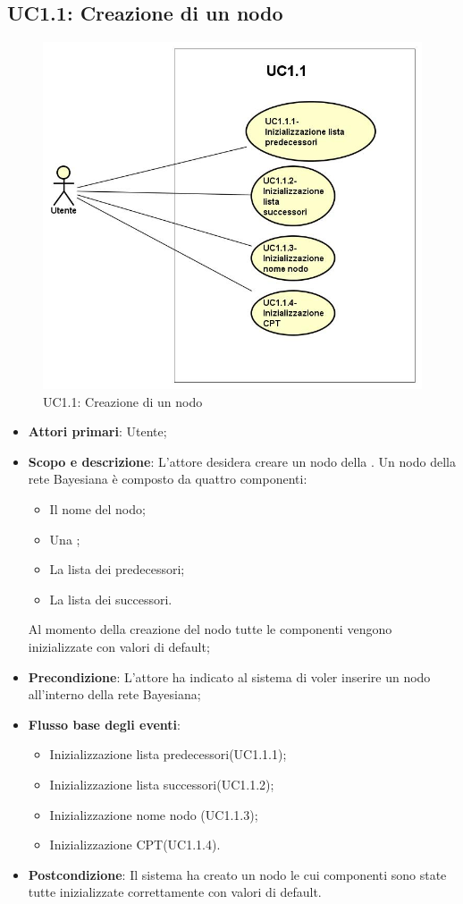 \subsection{UC1.1: Creazione di un nodo}
\hypertarget{UC1.1}{}  
\begin{figure} [H]
	\centering
	\includegraphics[scale=0.45]{Img/UC1-1} 
	\caption{UC1.1: Creazione di un nodo} \label{} 
\end{figure} 
\begin{itemize} 
	\item{\textbf{Attori primari}: Utente;} 
	\item{\textbf{Scopo e descrizione}: L'attore desidera creare un nodo della . Un nodo della rete Bayesiana è composto da quattro componenti: 
		\begin{itemize} 
			\item{Il nome del nodo;} 
			\item{Una ;} 
			\item{La lista dei predecessori;} 
			\item{La lista dei successori.} 
		\end{itemize} 
		Al momento della creazione del nodo tutte le componenti vengono inizializzate con valori di default;} 
	\item{\textbf{Precondizione}: L'attore ha indicato al sistema di voler inserire un nodo all'interno della rete Bayesiana;} 
	\item{\textbf{Flusso base degli eventi}: } 
	\begin{itemize} 
		\item{Inizializzazione lista predecessori(UC1.1.1);} 
		\item{Inizializzazione lista successori(UC1.1.2);} 
		\item{Inizializzazione nome nodo (UC1.1.3);} 
		\item{Inizializzazione CPT(UC1.1.4).} 
	\end{itemize} 
	\item{\textbf{Postcondizione}: Il sistema ha creato un nodo le cui componenti sono state tutte inizializzate correttamente con valori di default.} 
\end{itemize} 
